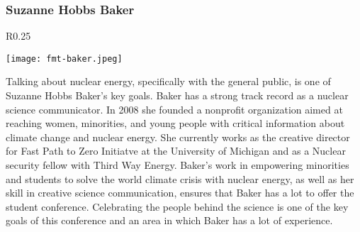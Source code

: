 \subsubsection{Suzanne Hobbs Baker}
\setlength\intextsep{0pt}
\begin{wrapfigure}{R}{0.25\textwidth}
	\begin{center}
		\texttt{[image: fmt-baker.jpeg]}
	\end{center}
\end{wrapfigure}
Talking about nuclear energy, specifically with the general public, is one of Suzanne Hobbs Baker's key goals. Baker has a strong track record as a nuclear science communicator. In 2008 she founded a nonprofit organization aimed at reaching women, minorities, and young people with critical information about climate change and nuclear energy. She currently works as the creative director for Fast Path to Zero Initiatve at the University of Michigan and as a Nuclear security fellow with Third Way Energy. Baker's work in empowering minorities and students to solve the world climate crisis with nuclear energy, as well as her skill in creative science communication, ensures that Baker has a lot to offer the student conference. Celebrating the people behind the science is one of the key goals of this conference and an area in which Baker has a lot of experience.\\

